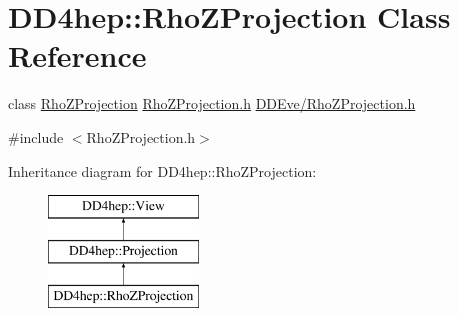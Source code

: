\hypertarget{class_d_d4hep_1_1_rho_z_projection}{}\section{D\+D4hep\+:\+:Rho\+Z\+Projection Class Reference}
\label{class_d_d4hep_1_1_rho_z_projection}


class \hyperlink{class_d_d4hep_1_1_rho_z_projection}{Rho\+Z\+Projection} \hyperlink{_rho_z_projection_8h}{Rho\+Z\+Projection.\+h} \hyperlink{_rho_z_projection_8h}{D\+D\+Eve/\+Rho\+Z\+Projection.\+h}  




{\ttfamily \#include $<$Rho\+Z\+Projection.\+h$>$}

Inheritance diagram for D\+D4hep\+:\+:Rho\+Z\+Projection\+:\begin{figure}[H]
\begin{center}
\leavevmode
\includegraphics[height=3.000000cm]{class_d_d4hep_1_1_rho_z_projection}
\end{center}
\end{figure}
